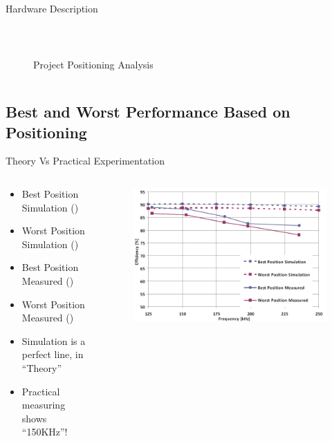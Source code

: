 \begin{frame}{Hardware Description}
\begin{columns}[t]
\begin{column}[T]{5cm}
\begin{figure}
{\begin{subfigure}[b]{1.0\linewidth}
          \end{subfigure}
        }
      \captionsetup{justification=centering} %
      \caption{Project Positioning Analysis} \protect\label{fig:5}~\cite{wsn}
    \end{figure}
    \end{column}
  \end{columns}
\end{frame}

\subsection{Best and Worst Performance Based on Positioning}

\begin{frame}{Theory Vs Practical Experimentation}
    \begin{columns}[t] %
      \begin{column}[T]{5cm} %
        \begin{itemize}
            \item<+-| alert@+> Best Position Simulation ()
            \item<+-| alert@+> Worst Position Simulation (\alert{})
            \item<+-| alert@+> Best Position Measured ()
            \item<+-| alert@+> Worst Position Measured (\alert{})
            \item<+-| alert@+> Simulation is a perfect line, in ``\alert{Theory}''
            \item<+-| alert@+> Practical measuring shows ``\alert{150KHz}''!
        \end{itemize}
      \end{column}
    \begin{column}[T]{5cm} %
      \begin{figure}
        \vspace*{-10pt}
        \centerline{\includegraphics[scale=0.7]{./png/efficiency}}

\end{figure}
\end{column}
\end{columns}
\end{frame}
